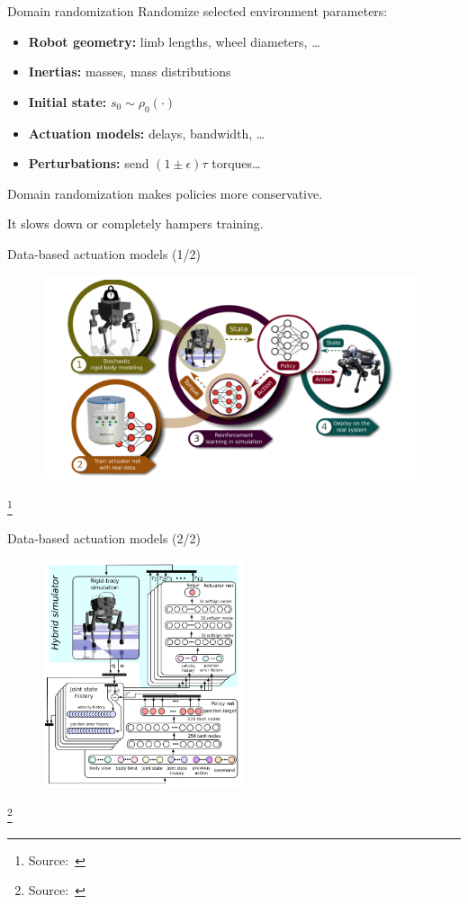 \documentclass[10pt, aspectratio=1610]{beamer}
\newcommand\blfootnote[1]{%
  \begingroup
  \renewcommand\thefootnote{}%
  \footnote{#1}%
  \addtocounter{footnote}{-1}%
  \endgroup
}
\begin{document}
\begin{frame}{Domain randomization}
    Randomize selected environment parameters:
    \begin{itemize}
        \item \textbf{Robot geometry:} limb lengths, wheel diameters, \ldots
        \item \textbf{Inertias:} masses, mass distributions
        \item \textbf{Initial state:} $s_0 \sim \rho_0(\cdot)$
        \item \textbf{Actuation models:} delays, bandwidth, \ldots
        \item \textbf{Perturbations:} send $(1 \pm \epsilon) \tau$ torques\ldots
    \end{itemize}
    Domain randomization makes policies more conservative.

    It slows down or completely hampers training.
\end{frame}

\begin{frame}{Data-based actuation models (1/2)}
    \begin{figure}
        \includegraphics[height=6cm]{figures/quadruped-sim-pipeline.png}
    \end{figure}
    \blfootnote{
        Source:~\cite{hwangbo2019}
    }
\end{frame}

\begin{frame}{Data-based actuation models (2/2)}
    \begin{figure}
        \includegraphics[height=6.7cm]{figures/quadruped-training.png}
    \end{figure}
    \vspace{-0.7cm}
    \blfootnote{
        Source:~\cite{hwangbo2019}
    }
\end{frame}
\end{document}
